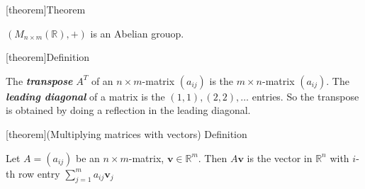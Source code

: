 \documentclass[12pt]{report}
\theoremstyle{definition}
\begin{document}
[theorem]{Theorem}
\begin{addition on matrix is Abelian}
    $(M_{n \times m}(\mathbb{R}), +)$ is an Abelian grouop.
\end{addition on matrix is Abelian}

[theorem]{Definition}
\begin{transpose}
    The \textbf{\emph{transpose}} $A^{T}$ of an $n \times m$-matrix $(a_{ij})$ is 
    the $m \times n$-matrix $(a_{ij})$.
    The \textbf{\emph{leading diagonal}} of a matrix is the $(1, 1), (2, 2), \ldots$ entries.
    So the transpose is obtained by doing a reflection in the leading diagonal.
\end{transpose}

[theorem]{(Multiplying matrices with vectors) Definition}
\begin{multiplying matrix with vector}
    Let $A = (a_{ij})$ be an $n \times m$-matrix, $\mathbf{v} \in \mathbb{R}^{m}$.
    Then $A\mathbf{v}$ is the vector in $\mathbb{R}^{n}$ with $i$-th row entry $\sum_{j=1}^{m} a_{ij}\mathbf{v}_j$
\end{multiplying matrix with vector}
\end{document}
